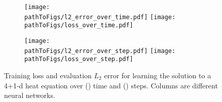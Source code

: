 \begin{figure}[!h]
  \centering
  \def\pathToFigs{../kfac_pinns_exp/exp30_heat4d_groupplot}
  \begin{subfigure}[t]{1.0\linewidth}
    \caption{}\label{subfig:heat4d-time}
    \texttt{[image: \\pathToFigs/l2\_error\_over\_time.pdf]}
    \texttt{[image: \\pathToFigs/loss\_over\_time.pdf]}
  \end{subfigure}
  \begin{subfigure}[t]{1.0\linewidth}
    \caption{}\label{subfig:heat4d-step}
    \texttt{[image: \\pathToFigs/l2\_error\_over\_step.pdf]}
    \texttt{[image: \\pathToFigs/loss\_over\_step.pdf]}
  \end{subfigure}
  \caption{Training loss and evaluation $L_2$ error for learning the solution to a 4+1-d heat equation over () time and () steps.
    Columns are different neural networks.}\label{fig:heat4d-appendix}
\end{figure}

